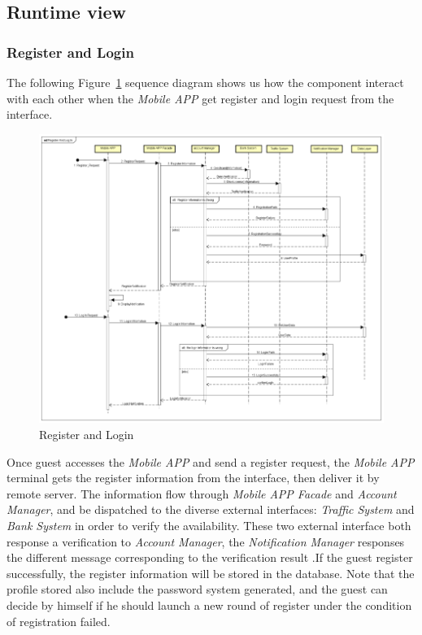 \documentclass[a4paper,11pt]{article}
\begin{document}
	\subsection{Runtime view}	
		\subsubsection{Register and Login}
The following Figure~\ref{fig-login} sequence diagram shows us how the component interact with each other when the \textsl{Mobile APP} get register and login request from the interface.

		\begin{figure}[H]
   			\centering
   			\includegraphics[width=\textwidth]{images/register_and_login_SD}
  	    		\caption{Register and Login}\label{fig-login}
		\end{figure}
		
Once guest accesses the \textsl{Mobile APP} and send a register request, the \textsl{Mobile APP} terminal gets the register information from the interface, then deliver it by remote server. The information flow through \textsl{Mobile APP Facade} and \textsl{Account Manager}, and be dispatched to the diverse external interfaces: \textsl{Traffic System} and \textsl{Bank System} in order to verify the availability. These two external interface both response a verification to \textsl{Account Manager}, the \textsl{Notification Manager} responses the different message corresponding to the verification result .If the guest register successfully, the register information will be stored in the database. Note that the profile stored also include the password system generated, and the guest can decide by himself if he should launch a new round of register under the condition of registration failed.
\end{document}
